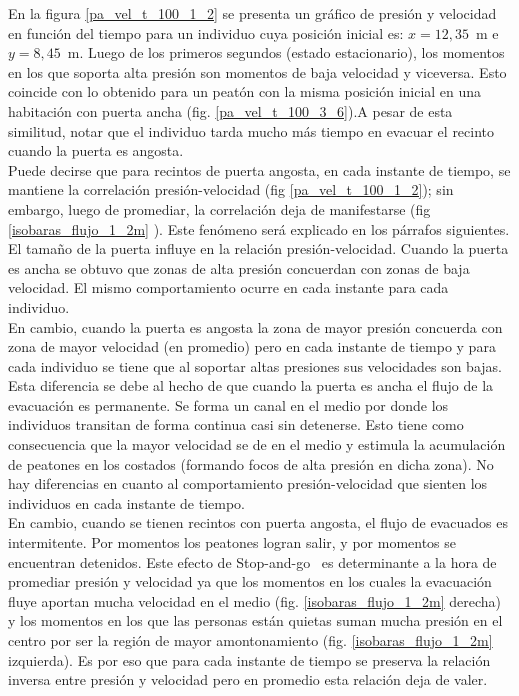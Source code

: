 En la figura \ref{pa_vel_t_100_1_2} se presenta un gráfico de presión y velocidad en función del tiempo para un individuo cuya posición inicial es: $x=12,35$~m e $y=8,45$~m. Luego de los primeros segundos (estado estacionario), los momentos en los que soporta alta presión son momentos de baja velocidad y viceversa. Esto coincide con lo obtenido para un peatón con la misma posición inicial en una habitación con puerta ancha (fig. \ref{pa_vel_t_100_3_6}).A pesar de esta similitud, notar que el individuo tarda mucho más tiempo en evacuar el recinto cuando la puerta es angosta. \\

Puede decirse que para recintos de puerta angosta, en cada instante de tiempo, se mantiene la correlación presión-velocidad (fig \ref{pa_vel_t_100_1_2}); sin embargo, luego de promediar, la correlación deja de manifestarse (fig \ref{isobaras_flujo_1_2m} ). Este fenómeno será explicado en los párrafos siguientes. \\

El tamaño de la puerta influye en la relación presión-velocidad. Cuando la puerta es ancha se obtuvo que zonas de alta presión concuerdan con zonas de baja velocidad. El mismo comportamiento ocurre en cada instante para cada individuo. \\

En cambio, cuando la puerta es angosta la zona de mayor presión concuerda con zona de mayor velocidad (en promedio) pero en cada instante de tiempo y para cada individuo se tiene que al soportar altas presiones sus velocidades son bajas. \\

Esta diferencia se debe al hecho de que cuando la puerta es ancha el flujo de la evacuación es permanente. Se forma un canal en el medio por donde los individuos transitan de forma continua casi sin detenerse. Esto tiene como consecuencia que la mayor velocidad se de en el medio y estimula la acumulación de peatones en los costados (formando focos de alta presión en dicha zona). No hay diferencias en cuanto al comportamiento presión-velocidad que sienten los individuos en cada instante de tiempo.\\

En cambio, cuando se tienen recintos con puerta angosta, el flujo de evacuados es intermitente. Por momentos los peatones logran salir, y por momentos se encuentran detenidos. Este efecto de Stop-and-go~\cite{stop-go} es determinante a la hora de promediar presión y velocidad ya que los momentos en los cuales la evacuación fluye aportan mucha velocidad en el medio (fig. \ref{isobaras_flujo_1_2m} derecha) y los momentos en los que las personas están quietas suman mucha presión en el centro por ser la región de mayor amontonamiento (fig. \ref{isobaras_flujo_1_2m} izquierda). Es por eso que para cada instante de tiempo se preserva la relación inversa entre presión y velocidad pero en promedio esta relación deja de valer.

